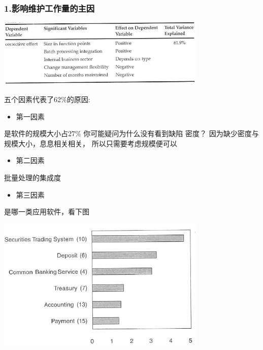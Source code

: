 \hypertarget{ux5f71ux54cdux7ef4ux62a4ux5de5ux4f5cux91cfux7684ux4e3bux56e0}{%
\subsubsection{1.影响维护工作量的主因}\label{ux5f71ux54cdux7ef4ux62a4ux5de5ux4f5cux91cfux7684ux4e3bux56e0}}


\includegraphics[width=10cm]{maxwell_t54.jpg}

五个因素代表了62\%的原因:

\begin{itemize}
\tightlist
\item
  第一因素
\end{itemize}

是软件的规模大小占27\% 你可能疑问为什么没有看到缺陷 密度？
因为缺少密度与规模大小，息息相关相关， 所以只需要考虑规模便可以

\begin{itemize}
\tightlist
\item
  第二因素
\end{itemize}

批量处理的集成度

\begin{itemize}
\tightlist
\item
  第三因素
\end{itemize}

是哪一类应用软件，看下图


\includegraphics[width=10cm]{maxwell_f52.jpg}

